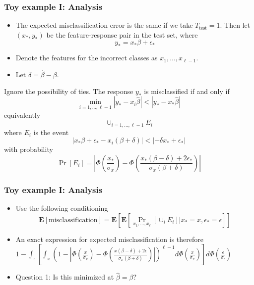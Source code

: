 \documentclass{beamer}
\newcommand{\E}{\textbf{E}}
\begin{document}
\begin{frame}
\frametitle{Toy example I: Analysis}
\begin{itemize}
\item
The expected misclassification error is the same if we take $T_{\text{test}} = 1$.
Then let $(x_*, y_*)$ be the feature-response pair in the test set, where
\[
y_* = x_* \beta + \epsilon_*
\]
\item
Denote the features for the incorrect classes as $x_1, \hdots, x_{\ell -1}$.
\item
Let $\delta = \hat{\beta} - \beta$.
\end{itemize}
\end{frame}

\begin{frame}
Ignore the possibility of ties.
The response $y_*$ is misclassified if and only if
\[
\min_{i=1,\hdots, \ell-1} |y_* -  x_i \hat{\beta}| < |y_* - x_*\hat{\beta}|
\]
equivalently
\[
\cup_{i=1,\hdots, \ell-1} E_i
\]
where $E_i$ is the event
\[
|x_* \beta + \epsilon_* - x_i (\beta + \delta)| < |- \delta x_* + \epsilon_*|
\]
with probability
\[
\Pr[E_i] = \left|
\Phi\left(\frac{x_*}{\sigma_x}\right)
 - 
\Phi\left(\frac{x_*(\beta - \delta) + 2\epsilon_*}{\sigma_x (\beta + \delta)}\right)
\right|
\]
\end{frame}

\begin{frame}
\frametitle{Toy example I: Analysis}
\begin{itemize}
\item
Use the following conditioning
\[
\E[\text{misclassification}] = \E[\E[\Pr_{x_1,\hdots,x_\ell}[\cup_i E_i] | x_* = x, \epsilon_* = \epsilon]]
\]
\item
An exact expression for expected misclassification is therefore\\
$
1 - \int_\epsilon \left[\int_x  
\left(1 - 
\left|
\Phi\left(\frac{x}{\sigma_x}\right)
 - 
\Phi\left(\frac{x(\beta - \delta) + 2\epsilon}{\sigma_x (\beta + \delta)}\right)
\right|\right)^{\ell - 1}
 d\Phi(\frac{x}{\sigma_x}) \right]  d\Phi(\frac{\epsilon}{\sigma_\epsilon})
$
\item Question 1: Is this minimized at $\hat{\beta} = \beta$?
\end{itemize}
\end{frame}
\end{document}
